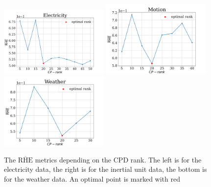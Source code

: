 \documentclass[referee, pdflatex, sn-mathphys-num]{sn-jnl}
\theoremstyle{definition}
\theoremstyle{plain}
\begin{document}
\begin{appendices}
		\begin{figure}[h]
			\centering
			\includegraphics[width=0.48\textwidth, keepaspectratio]{RHE_mean_elec.png}
			\includegraphics[width=0.48\textwidth, keepaspectratio]{RHE_mean_motion.png}
			\includegraphics[width=0.48\textwidth, keepaspectratio]{RHE_mean_weather}
			\caption{The $ \overline{\text{RHE}} $ metrics depending on the CPD rank. The left is for the electricity data, the right is for the inertial unit data, the bottom is for the weather data. An optimal point is marked with red}\label{fig:decomp_rhe_rank}
		\end{figure}
		
	\end{appendices}

 
\end{document}
